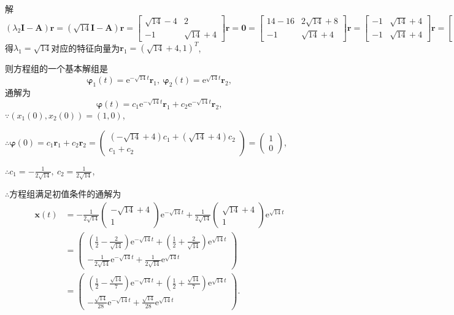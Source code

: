 \documentclass[12pt,UTF8]{ctexart}
\newcommand{\me}[0]{\mathrm e}
\begin{document}
\begin{enumerate}
解$(\lambda_2\bm I-\bm A)\bm r=(\sqrt{14}\bm I-\bm A)\bm r=\begin{bmatrix}\sqrt{14}-4&2\\-1&\sqrt{14}+4\end{bmatrix}\bm r=\bm0=\begin{bmatrix}14-16&2\sqrt{14}+8\\-1&\sqrt{14}+4\end{bmatrix}\bm r=\begin{bmatrix}-1&\sqrt{14}+4\\-1&\sqrt{14}+4\end{bmatrix}\bm r=\begin{bmatrix}-1&\sqrt{14}+4\\0&0\end{bmatrix}\bm r$得$\lambda_1=\sqrt{14}$对应的特征向量为$\bm r_1=(\sqrt{14}+4,1)^T$,

则方程组的一个基本解组是
\[\bm\varphi_1(t)=\me^{-\sqrt{14}t}\bm r_1,\ \bm\varphi_2(t)=\me^{\sqrt{14}t}\bm r_2,\]
通解为
\[\bm\varphi(t)=c_1\me^{-\sqrt{14}t}\bm r_1+c_2\me^{-\sqrt{14}t}\bm r_2,\]
$\because(x_1(0),x_2(0))=(1,0)$,

$\therefore\bm\varphi(0)=c_1\bm r_1+c_2\bm r_2=\begin{pmatrix}
(-\sqrt{14}+4)c_1+(\sqrt{14}+4)c_2\\
c_1+c_2
\end{pmatrix}=\begin{pmatrix}1\\0\end{pmatrix}$,

$\therefore c_1=-\frac1{2\sqrt{14}},\ c_2=\frac1{2\sqrt{14}}$,

$\therefore$方程组满足初值条件的通解为
\[\begin{aligned}
\bm x(t)&=-\frac1{2\sqrt{14}}\begin{pmatrix}-\sqrt{14}+4\\1\end{pmatrix}\me^{-\sqrt{14}t}+\frac1{2\sqrt{14}}\begin{pmatrix}\sqrt{14}+4\\1\end{pmatrix}\me^{\sqrt{14}t}\\
&=\begin{pmatrix}
(\frac12-\frac2{\sqrt{14}})\me^{-\sqrt{14}t}+(\frac12+\frac2{\sqrt{14}})\me^{\sqrt{14}t}\\
-\frac1{2\sqrt{14}}\me^{-\sqrt{14}t}+\frac1{2\sqrt{14}}\me^{\sqrt{14}t}
\end{pmatrix}\\
&=\begin{pmatrix}
(\frac12-\frac{\sqrt{14}}7)\me^{-\sqrt{14}t}+(\frac12+\frac{\sqrt{14}}7)\me^{\sqrt{14}t}\\
-\frac{\sqrt{14}}{28}\me^{-\sqrt{14}t}+\frac{\sqrt{14}}{28}\me^{\sqrt{14}t}
\end{pmatrix}.
\end{aligned}\]


\end{enumerate}
\end{document}
